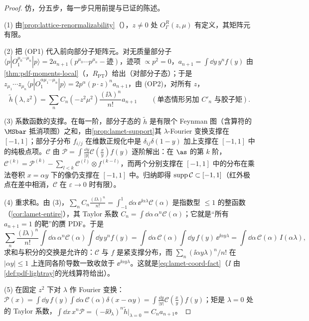 \begin{proof}
仿\cite[第~II~节]{IzubuchiEtAl2018}，分五步，每一步只用前提与已证的陈述。

(1) 由\cref{prop:lattice-renormalizability}（\tagA），$z\neq0$ 处 $O^R_\Gamma(z,\mu)$ 有定义，其矩阵元有限。

(2) 把 (OP1) 代入前向部分子矩阵元。对无质量部分子 $\langle p|O_1^{\mu_0\cdots\mu_n}|p\rangle=2a_{n+1}(p^{\mu_0}\cdots p^{\mu_n}-\text{迹})$，迹项 $\propto p^2=0$，$a_{n+1}=\int\dd y\,y^nf(y)$ 由\cref{thm:pdf-moments-local}（\tagR，$R_{\mathrm{PT}}$）给出（对部分子态）；于是 $z_{\mu_1}\cdots z_{\mu_n}\langle p|O_1^{\alpha\mu_1\cdots\mu_n}|p\rangle=2p^\alpha(p\cdot z)^na_{n+1}$，由 (OP2)，对所有 $z$，
\[
\tilde h(\lambda,z^2)=\sum_nC_n(-z^2\mu^2)\frac{(\ii\lambda)^n}{n!}a_{n+1}\qquad(\text{单态情形另加 }C'_n\text{ 与胶子矩}).
\]

(3) 系数函数的支撑。在每一阶，部分子态的 $\tilde h$ 是有限个 Feynman 图（含算符的 $\MSbar$ 抵消项图）之和，由\cref{prop:lamet-support}其 $\lambda$-Fourier 变换支撑在 $[-1,1]$；部分子分布 $f_{i/j}$ 在维数正规化中是 $\delta_{ij}\delta(1-y)$ 加上支撑在 $[-1,1]$ 中的纯极点项。$\mathcal C$ 由 $\mathcal P=\int\frac{\dd y}{|y|}\mathcal C(\frac xy)f(y)$ 逐阶解出：在 $\as$ 的第 $k$ 阶，$\mathcal C^{(k)}=\mathcal P^{(k)}-\sum_{l<k}\mathcal C^{(l)}\otimes f^{(k-l)}$，而两个分别支撑在 $[-1,1]$ 中的分布在乘法卷积 $x=\alpha y$ 下的像仍支撑在 $[-1,1]$ 中。归纳即得 ${\rm supp}\,\mathcal C\subset[-1,1]$（红外极点在差中相消，$\mathcal C$ 在 $\varepsilon\to0$ 时有限）。

(4) 重求和。由 (3)，$\sum_nC_n\frac{(\ii\lambda)^n}{n!}=\int_{-1}^1\dd\alpha\,\ee^{\ii\alpha\lambda}\mathcal C(\alpha)$ 是指数型 $\le1$ 的整函数（\cref{cor:lamet-entire}），其 Taylor 系数 $C_n=\int\dd\alpha\,\alpha^n\mathcal C(\alpha)$；它就是“所有 $a_{n+1}=1$ 的靶”的赝 PDF。于是
\[
\sum_n\frac{(\ii\lambda)^n}{n!}\int\dd\alpha\,\alpha^n\mathcal C(\alpha)\int\dd y\,y^nf(y)=\int\dd\alpha\,\mathcal C(\alpha)\int\dd y\,f(y)\,\ee^{\ii\alpha y\lambda}=\int\dd\alpha\,\mathcal C(\alpha)\,I(\alpha\lambda),
\]
求和与积分的交换是允许的：$\mathcal C$ 与 $f$ 是紧支撑分布，而 $\sum_n(\ii\alpha y\lambda)^n/n!$ 在 $|\alpha y|\le1$ 上连同各阶导数一致收敛于 $\ee^{\ii\alpha y\lambda}$。这就是\cref{eq:lamet-coord-fact}（$I$ 由\cref{def:pdf-lightray}的光线算符给出）。

(5) 在固定 $z^2$ 下对 $\lambda$ 作 Fourier 变换：$\mathcal P(x)=\int\dd y\,f(y)\int\dd\alpha\,\mathcal C(\alpha)\delta(x-\alpha y)=\int\frac{\dd y}{|y|}\mathcal C(\frac xy)f(y)$；矩是 $\lambda=0$ 处的 Taylor 系数，$\int\dd x\,x^n\mathcal P=(-\ii\partial_\lambda)^n\tilde h|_{\lambda=0}=C_na_{n+1}$。
\end{proof}

